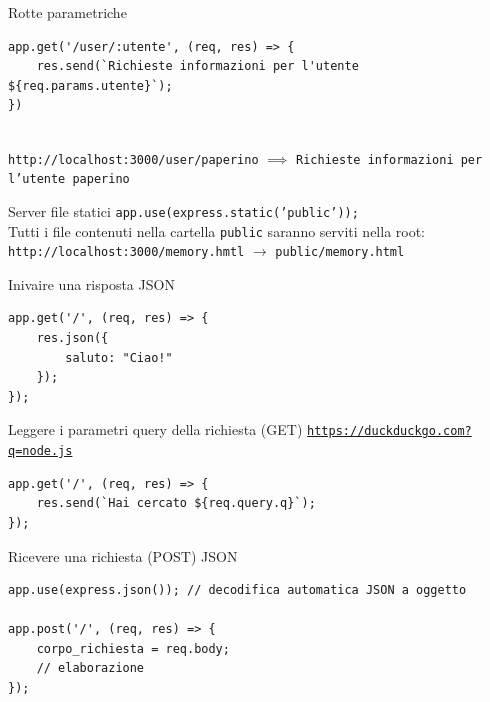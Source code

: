 \begin{frame}[fragile]{Rotte parametriche}\transfade\centering
  \begin{verbatim}
app.get('/user/:utente', (req, res) => {
    res.send(`Richieste informazioni per l'utente ${req.params.utente}`);
})
  \end{verbatim}
    \pause~\\\bigskip
    \texttt{http://localhost:3000/user/paperino} $\implies$ \texttt{Richieste informazioni per l'utente paperino}\\
\end{frame}

\begin{frame}[fragile]{Server file statici}\transfade\centering
  \texttt{app.use(express.static('public'));}\medskip\\
  Tutti i file contenuti nella cartella \texttt{public} saranno serviti nella root:\\
  \texttt{http://localhost:3000/memory.hmtl} $\rightarrow$ \texttt{public/memory.html}\\
\end{frame}


\begin{frame}[fragile]{Inivaire una risposta JSON}\transfade\centering
  \begin{verbatim}
app.get('/', (req, res) => {
    res.json({
        saluto: "Ciao!"
    });
});
  \end{verbatim}
\end{frame}


\begin{frame}[fragile]{Leggere i parametri query della richiesta (GET)}\transfade\centering
  \href{https://duckduckgo.com?q=node.js}{\texttt{https://duckduckgo.com\color{red}?q=node.js}}\bigskip
  \begin{verbatim}
app.get('/', (req, res) => {
    res.send(`Hai cercato ${req.query.q}`);
});
  \end{verbatim}
\end{frame}

\begin{frame}[fragile]{Ricevere una richiesta (POST) JSON}\transfade\centering
  \begin{verbatim}
app.use(express.json()); // decodifica automatica JSON a oggetto

app.post('/', (req, res) => {
    corpo_richiesta = req.body;
    // elaborazione
});
  \end{verbatim}
\end{frame}


